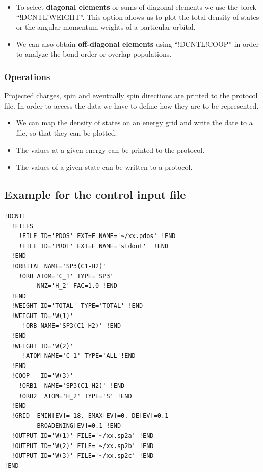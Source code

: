 \documentclass[final,12pt]{article}
\begin{document}
{{{{\begin{itemize}

\item To select {\bf diagonal elements} or sums of diagonal elements we use
  the block ``!DCNTL!WEIGHT''. This option allows us to plot the
  total density of states or the angular momentum weights of a
  particular orbital.

\item We can also obtain {\bf off-diagonal elements} using
  ``!DCNTL!COOP'' in order to analyze the bond order or overlap
  populations.

\end{itemize}

\subsubsection{Operations}
Projected charges, spin and eventually spin directions are printed to
the protocol file.  In order to access the data we have to define how
they are to be represented.
\begin{itemize}
\item We can map the density of states on an energy grid and write the
date to a file, so that they can be plotted.
\item The values at a given energy can be printed to the protocol.
\item The values of a given state can be written to a protocol.
\end{itemize}




\subsection{Example for the control input file}

\begin{verbatim}
!DCNTL
  !FILES 
    !FILE ID='PDOS' EXT=F NAME='~/xx.pdos' !END
    !FILE ID='PROT' EXT=F NAME='stdout'  !END
  !END
  !ORBITAL NAME='SP3(C1-H2)'
    !ORB ATOM='C_1' TYPE='SP3' 
         NNZ='H_2' FAC=1.0 !END
  !END
  !WEIGHT ID='TOTAL' TYPE='TOTAL' !END
  !WEIGHT ID='W(1)'
     !ORB NAME='SP3(C1-H2)' !END
  !END
  !WEIGHT ID='W(2)'
     !ATOM NAME='C_1' TYPE='ALL'!END
  !END
  !COOP   ID='W(3)'
    !ORB1  NAME='SP3(C1-H2)' !END
    !ORB2  ATOM='H_2' TYPE='S' !END
  !END
  !GRID  EMIN[EV]=-18. EMAX[EV]=0. DE[EV]=0.1 
         BROADENING[EV]=0.1 !END
  !OUTPUT ID='W(1)' FILE='~/xx.sp2a' !END
  !OUTPUT ID='W(2)' FILE='~/xx.sp2b' !END
  !OUTPUT ID='W(3)' FILE='~/xx.sp2c' !END
!END
\end{verbatim}

}}}}
\end{document}
